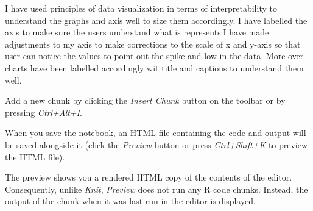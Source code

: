 \documentclass[
]{article}
\begin{document}
I have used principles of data visualization in terms of
interpretability to understand the graphs and axis well to size them
accordingly. I have labelled the axis to make sure the users understand
what is represents.I have made adjustments to my axis to make
corrections to the scale of x and y-axis so that user can notice the
values to point out the spike and low in the data. More over charts have
been labelled accordingly wit title and captions to understand them
well.

Add a new chunk by clicking the \emph{Insert Chunk} button on the
toolbar or by pressing \emph{Ctrl+Alt+I}.

When you save the notebook, an HTML file containing the code and output
will be saved alongside it (click the \emph{Preview} button or press
\emph{Ctrl+Shift+K} to preview the HTML file).

The preview shows you a rendered HTML copy of the contents of the
editor. Consequently, unlike \emph{Knit}, \emph{Preview} does not run
any R code chunks. Instead, the output of the chunk when it was last run
in the editor is displayed.
\end{document}
